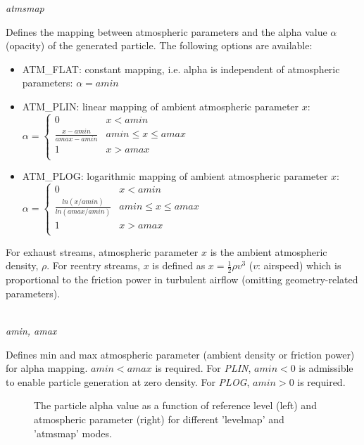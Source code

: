 \documentclass[Orbiter Developer Manual.tex]{subfiles}
\begin{document}
\noindent
\textit{atmsmap}
\begin{adjustwidth}{1cm}{0cm}
Defines the mapping between atmospheric parameters and the alpha value $\alpha$ (opacity) of the generated particle. The following options are available:

\begin{itemize}
\item ATM\_FLAT: constant mapping, i.e. alpha is independent of atmospheric parameters: $\alpha = amin$
\item ATM\_PLIN: linear mapping of ambient atmospheric parameter $x$:\\
$\alpha = 
\left\{
\begin{array}{ll}
	0 & x < amin \\
	\frac{x - amin}{amax - amin} & amin \leq x \leq amax \\
	1 & x > amax \\
\end{array} 
\right. $
\item ATM\_PLOG: logarithmic mapping of ambient atmospheric parameter $x$:\\
$\alpha = 
\left\{
\begin{array}{ll}
	0 & x < amin \\
	\frac{ln(x / amin)}{ln(amax / amin)} & amin \leq x \leq amax \\
	1 & x > amax \\
\end{array} 
\right. $
\end{itemize}
For exhaust streams, atmospheric parameter $x$ is the ambient atmospheric density, $\rho$. For reentry streams, $x$ is defined as $x = \frac{1}{2}\rho v^{3}$ ($v$: airspeed) which is proportional to the friction power in turbulent airflow (omitting geometry-related parameters).\\
\\
\end{adjustwidth}

\noindent
\textit{amin, amax}
\begin{adjustwidth}{1cm}{0cm}
Defines min and max atmospheric parameter (ambient density or friction power) for alpha mapping. $amin < amax$ is required. For \textit{PLIN}, $amin < 0$ is admissible to enable particle generation at zero density. For \textit{PLOG}, $amin > 0$ is required. 

\begin{figure}[H]
	\centering
	\caption{The particle alpha value as a function of reference level (left) and atmospheric parameter (right) for different 'levelmap' and 'atmsmap' modes.}
\end{figure}
\end{adjustwidth}
\end{document}
